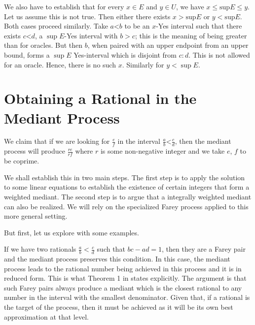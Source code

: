 \documentclass[12pt]{article}
\theoremstyle{remark}
\newcommand{\lt}{\mathord{<}}
\begin{document}
We also have to establish that for every $x \in E$ and $y \in U$, we have $x \leq \mathrm{sup} E \leq y$. Let us assume this is not true. Then either there exists $x > \mathrm{sup} E$ or $y < \mathrm{sup} E$. Both cases proceed similarly. Take $a \lt b$ to be an $x$-Yes interval such that there exists $c \lt d$, a $\sup E$-Yes interval with $b > c$; this is the meaning of being greater than for oracles. But then $b$, when paired with an upper endpoint from an upper bound, forms a $\sup E$ Yes-interval which is disjoint from $c:d$. This is not allowed for an oracle. Hence, there is no such $x$. Similarly for $y < \sup E$. 

\section{Obtaining a Rational in the Mediant Process}\label{app:med}

We claim that if we are looking for $\frac{e}{f}$ in the interval $\frac{a}{b} \lt \frac{c}{d}$, then the mediant process will produce $\frac{re}{rf}$ where $r$ is some non-negative integer and we take $e$, $f$ to be coprime. 

We shall establish this in two main steps. The first step is to apply the solution to some linear equations to establish the existence of certain integers that form a weighted mediant. The second step is to argue that a integrally weighted mediant can also be realized.  We will rely on the specialized Farey process applied to this more general setting. 

But first, let us explore with some examples. 

If we have two rationals $\frac{a}{b} < \frac{c}{d}$ such that $bc - ad = 1$, then they are a Farey pair and the mediant process preserves this condition. In this case, the mediant process leads to the rational number being achieved in this process and it is in reduced form. This is what Theorem 1 in \cite{richards} states explicitly. The argument is that such Farey pairs always produce a mediant which is the closest rational to any number in the interval with the smallest denominator. Given that, if a rational is the target of the process, then it must be achieved as it will be its own best approximation at that level. 
\end{document}
